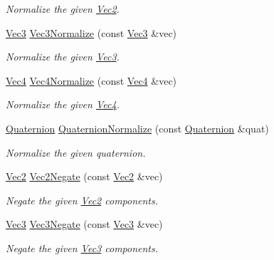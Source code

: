 \begin{DoxyCompactItemize}
\begin{DoxyCompactList}\small\item\em Normalize the given \hyperlink{classgofxmath_1_1_vec2}{Vec2}. \end{DoxyCompactList}\item 
\hyperlink{classgofxmath_1_1_vec3}{Vec3} \hyperlink{group___s_i_s_d_vec_math_gafdbff8ff3fad75f9a9e924a58fcc4f4a}{Vec3\+Normalize} (const \hyperlink{classgofxmath_1_1_vec3}{Vec3} \&vec)
\begin{DoxyCompactList}\small\item\em Normalize the given \hyperlink{classgofxmath_1_1_vec3}{Vec3}. \end{DoxyCompactList}\item 
\hyperlink{classgofxmath_1_1_vec4}{Vec4} \hyperlink{group___s_i_s_d_vec_math_gaf1fa3fbf9843a509f3b8a476aa18361b}{Vec4\+Normalize} (const \hyperlink{classgofxmath_1_1_vec4}{Vec4} \&vec)
\begin{DoxyCompactList}\small\item\em Normalize the given \hyperlink{classgofxmath_1_1_vec4}{Vec4}. \end{DoxyCompactList}\item 
\hyperlink{classgofxmath_1_1_quaternion}{Quaternion} \hyperlink{group___s_i_s_d_vec_math_ga0b4dfb2804fb5c44a112dc6b8ea43278}{Quaternion\+Normalize} (const \hyperlink{classgofxmath_1_1_quaternion}{Quaternion} \&quat)
\begin{DoxyCompactList}\small\item\em Normalize the given quaternion. \end{DoxyCompactList}\item 
\hyperlink{classgofxmath_1_1_vec2}{Vec2} \hyperlink{group___s_i_s_d_vec_math_ga55959c707ef1b444eb2d71009a201aa2}{Vec2\+Negate} (const \hyperlink{classgofxmath_1_1_vec2}{Vec2} \&vec)
\begin{DoxyCompactList}\small\item\em Negate the given \hyperlink{classgofxmath_1_1_vec2}{Vec2} components. \end{DoxyCompactList}\item 
\hyperlink{classgofxmath_1_1_vec3}{Vec3} \hyperlink{group___s_i_s_d_vec_math_ga8ccc52146f984a79c566ee8348e410e2}{Vec3\+Negate} (const \hyperlink{classgofxmath_1_1_vec3}{Vec3} \&vec)
\begin{DoxyCompactList}\small\item\em Negate the given \hyperlink{classgofxmath_1_1_vec3}{Vec3} components. \end{DoxyCompactList}\item 

\end{DoxyCompactItemize}
